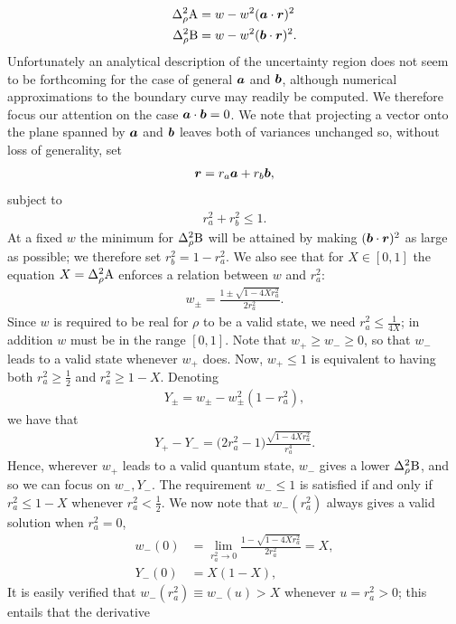\begin{align}
  \varr{\opa} &= w - w^2 (\boa\cdot\bor)^2\\
  \varr{\opb} &= w - w^2 (\bob\cdot\bor)^2.
\end{align}
Unfortunately an analytical description of the uncertainty region does not seem to be forthcoming for the case of general $\bm{a}$ and $\bm{b}$, although numerical approximations to the boundary curve may readily be computed. We therefore focus our attention on the case $\bm{a}\cdot\bm{b} = 0$. We note that projecting a vector onto the plane spanned by $\bm{a}$ and $\bm{b}$ leaves both of variances unchanged so, without loss of generality, set 
\begin{align}
  \bm{r} = r_a \bm{a} + r_b \bm{b},
\end{align}
subject to
\begin{align}
  r_a^2 + r_b^2 \leq 1.
\end{align}
At a fixed $w$ the minimum for $\varr{\opb}$ will be attained by making $(\bm{b}\cdot\bm{r})^2$ as large as possible; we therefore set $r_b^2 = 1-r_a^2$. We also see that for $X\in [0,1]$ the equation $X = \varr{\opa}$ enforces a relation between $w$ and $r_a^2$: 
\begin{align}
  w_\pm = \frac{1\pm\sqrt{1 -4 X r_a^2}}{2r_a^2}.
\end{align}
Since $w$ is required to be real for $\rho$ to be a valid state, we need $r_a^2 \leq \frac{1}{4X}$; in addition $w$ must be in the range $[0,1]$. Note that  $w_+\ge w_-\ge 0$, so that $w_-$ leads to a valid state whenever $w_+$ does. Now, $w_+\le 1$ is equivalent to having both $r_a^2\ge\frac12$ and $r_a^2\ge 1-X$. Denoting
\begin{align}
  Y_\pm = w_\pm - w_\pm^2 (1-r_a^2),
\end{align}
we have that
\begin{align}
  Y_+ - Y_- =\bigl(2r_a^2-1\bigr)\frac{\sqrt{1-4 X r_a^2}}{r_a^4}.
\end{align}
Hence, wherever $w_+$ leads to a valid quantum state, $w_-$ gives a lower $\varr{\opb}$, and so we can focus on $w_-, Y_-$.
The requirement  $w_-\le 1$ is satisfied if and only if $r_a^2 \leq 1-X$ whenever $r_a^2 < \frac{1}{2}$. 
We now note that $w_-(r_a^2)$  always gives a valid solution when $r_a^2 = 0$,
\begin{align}
  w_-(0) &= \lim_{r_a^2 \to 0}  \frac{1 - \sqrt{1 -4 X r_a^2}}{2r_a^2} = X,\\
  Y_-(0) &= X(1-X),
\end{align}
It is easily verified that $w_-(r_a^2)\equiv w_-(u)>X$ whenever $u=r_a^2>0$; this entails that the derivative 
